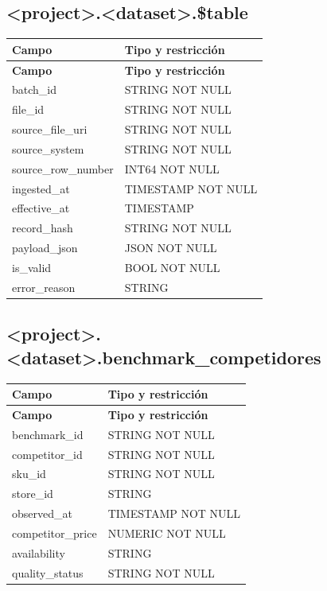 \documentclass[11pt]{article}
\begin{document}
\subsection{<project>.<dataset>.\$table}

\begingroup\small
\begin{longtable}{@{}>{\raggedright\arraybackslash}p{}>{\raggedright\arraybackslash}p{}@{}}
\toprule
\textbf{Campo} & \textbf{Tipo y restricción} \\
\midrule
\endfirsthead
\toprule
\textbf{Campo} & \textbf{Tipo y restricción} \\
\midrule
\endhead
batch\_\allowbreak{}id & STRING NOT NULL \\
file\_\allowbreak{}id & STRING NOT NULL \\
source\_\allowbreak{}file\_\allowbreak{}uri & STRING NOT NULL \\
source\_\allowbreak{}system & STRING NOT NULL \\
source\_\allowbreak{}row\_\allowbreak{}number & INT64 NOT NULL \\
ingested\_\allowbreak{}at & TIMESTAMP NOT NULL \\
effective\_\allowbreak{}at & TIMESTAMP \\
record\_\allowbreak{}hash & STRING NOT NULL \\
payload\_\allowbreak{}json & JSON NOT NULL \\
is\_\allowbreak{}valid & BOOL NOT NULL \\
error\_\allowbreak{}reason & STRING \\
\bottomrule
\end{longtable}
\endgroup

\subsection{<project>.<dataset>.benchmark\_\allowbreak{}competidores}

\begingroup\small
\begin{longtable}{@{}>{\raggedright\arraybackslash}p{}>{\raggedright\arraybackslash}p{}@{}}
\toprule
\textbf{Campo} & \textbf{Tipo y restricción} \\
\midrule
\endfirsthead
\toprule
\textbf{Campo} & \textbf{Tipo y restricción} \\
\midrule
\endhead
benchmark\_\allowbreak{}id & STRING NOT NULL \\
competitor\_\allowbreak{}id & STRING NOT NULL \\
sku\_\allowbreak{}id & STRING NOT NULL \\
store\_\allowbreak{}id & STRING \\
observed\_\allowbreak{}at & TIMESTAMP NOT NULL \\
competitor\_\allowbreak{}price & NUMERIC NOT NULL \\
availability & STRING \\
quality\_\allowbreak{}status & STRING NOT NULL \\
\bottomrule
\end{longtable}
\endgroup
\end{document}
